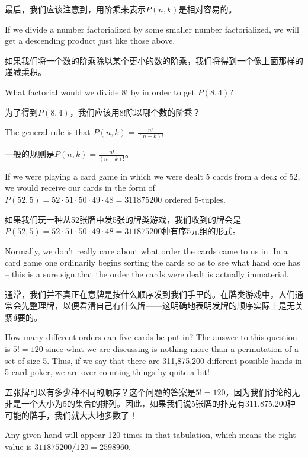 最后，我们应该注意到，用阶乘来表示$P(n,k)$是相对容易的。

If we divide a number factorialized by some smaller 
number factorialized, we will get a descending product just like those above.

如果我们将一个数的阶乘除以某个更小的数的阶乘，我们将得到一个像上面那样的递减乘积。

\begin{exer}
What factorial would we divide $8!$ by in order to get $P(8,4)$?
\end{exer}

\begin{exer}
为了得到$P(8,4)$，我们应该用$8!$除以哪个数的阶乘？
\end{exer}

The general rule is that $P(n,k) = \frac{n!}{(n-k)!}$.

一般的规则是$P(n,k) = \frac{n!}{(n-k)!}$。

If we were playing a card game in which we were dealt 5 cards from
a deck of 52, we would receive our cards in the form of 
$P(52,5) = 52 \cdot 51 \cdot 50 \cdot 49 \cdot 48 = 311875200$ ordered
$5$-tuples.

如果我们玩一种从52张牌中发5张的牌类游戏，我们收到的牌会是$P(52,5) = 52 \cdot 51 \cdot 50 \cdot 49 \cdot 48 = 311875200$种有序5元组的形式。

Normally, we don't really care about what order the cards
came to us in.  In a card game one ordinarily begins sorting the cards
so as to see what hand one has -- this is a sure sign that the order the
cards were dealt is actually immaterial.

通常，我们并不真正在意牌是按什么顺序发到我们手里的。在牌类游戏中，人们通常会先整理牌，以便看清自己有什么牌——这明确地表明发牌的顺序实际上是无关紧ย์要的。

How many different orders can
five cards be put in?  The answer to this question is $5! = 120$ since
what we are discussing is nothing more than a permutation of a set of
size 5.  Thus, if we say that there are 311,875,200 different possible 
hands in 5-card poker, we are over-counting things by quite a bit!

五张牌可以有多少种不同的顺序？这个问题的答案是$5! = 120$，因为我们讨论的无非是一个大小为5的集合的排列。因此，如果我们说5张牌的扑克有311,875,200种可能的牌手，我们就大大地多数了！

Any
given hand will appear 120 times in that tabulation, which means the 
right value is $311875200/120 = 2598960$.

